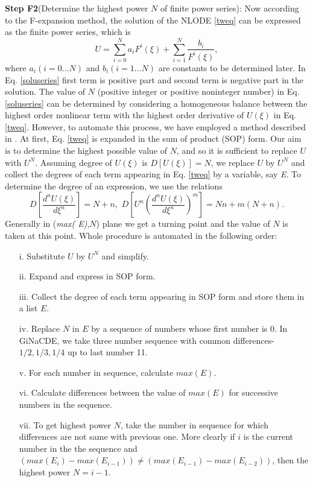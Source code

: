 \documentclass[prd,aps,floats,showkeys,nofootinbib,notitlepage]{revtex4-2}
\begin{document}
	\textbf{Step F2}(Determine the highest power $N$ of finite power series): 
	Now according to the F-expansion method, the solution of the NLODE \eqref{tweq} can be expressed as the finite power series, which is
	\begin{equation}\label{soluseries}
		U =  \sum\limits_{i = 0}^N {a_i{F^i}(\xi )}+\sum\limits_{i = 1}^N {\frac{{{b_i}}}{{F^i}(\xi )}},
	\end{equation}
	where $a_i(i=0\ldots N)$ and $b_i(i=1\ldots N)$ are constants to be determined later.
	In Eq. \eqref{soluseries} first term is positive part and second term is negative part in the solution. The value of $N$ (positive integer or positive noninteger number) in Eq. \eqref{soluseries} can be determined by considering a homogeneous balance between the highest order nonlinear term with the highest order derivative of $U(\xi)$ in Eq. \eqref{tweq}.
	However, to automate this process, we have employed a method described in \cite{rath}. At first, Eq. \eqref{tweq} is expanded in the sum of product (SOP) form. Our aim is to determine the highest possible value of $N$, and so it is sufficient to replace $U$ with $U^N$. Assuming degree of $U(\xi)$ is $D[U(\xi)]=N$, we replace $U$ by $U^N$ and collect the degrees of each term appearing in Eq. \eqref{tweq} by a variable, say {\em E}. To determine the degree of an expression, we use the relations
	\begin{equation}\label{degRltn}
		D\left[ {\frac{{{d^n}U(\xi )}}{{d{\xi ^n}}}} \right] = N + n,\,\,D\left[ {{U^n}{{\left( {\frac{{{d^n}U(\xi )}}{{d{\xi ^n}}}} \right)}^m}} \right] = Nn + m(N + n).
	\end{equation}
	Generally in ({\em max( E)},$N$) plane we get a turning point and the value of $N$ is taken at this point. Whole procedure is automated in the following order:
	\begin{itemize}
		\item[i.] Substitute $U$ by $U^N$ and simplify.
		\item[ii.] Expand and express in SOP form.
		\item[iii.] Collect the degree of each term appearing in SOP form and store them in a list $ E$.
		\item[iv.] Replace $N$ in $E$ by a sequence of numbers whose first number is 0. In GiNaCDE, we take three  number sequence with common differences- $1/2,1/3,1/4$ up to last number 11.
		\item[v.] For each number in sequence, calculate $ max( E)$.
		\item[vi.] Calculate differences between the value of  $ max( E)$ for successive numbers in the sequence.
		\item[vii.] To get highest power $N$, take the number in sequence for which differences are not same with previous one. More clearly if $i$ is the current number in the the sequence and $ ({max(E_i)} - {max(E_{i - 1})}) \ne ({max(E_{i - 1})} - {max(E_{i - 2})})$, then the highest power $N=i-1$.   
	\end{itemize}
\end{document}
